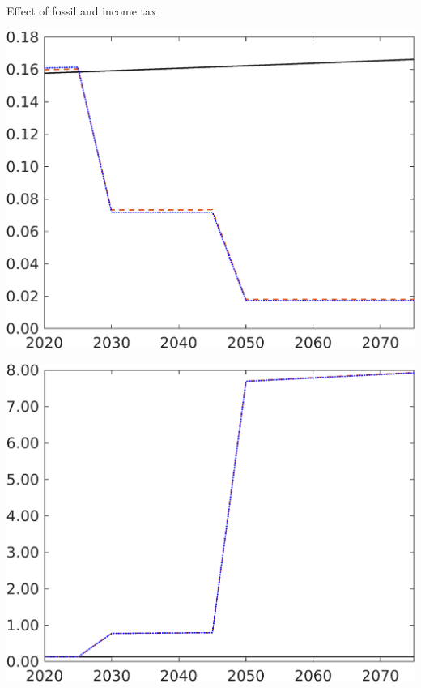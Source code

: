 \documentclass[11pt,aspectratio=169]{beamer}
\begin{document}
\begin{frame}{ Effect of fossil and income tax}
\begin{minipage}[]{0.3\textwidth}
	\end{minipage}
	\begin{minipage}[]{0.3\textwidth}
		\includegraphics[width=1\textwidth]{../codding_model/own_basedOnFried/optimalPol_elastS_DisuSci/figures/all_1705/CompCounterFac_withLF_taufopt1_taulopt0_F_spillover0_noskill0_sep1_BN0_ineq0_red0_xgrowth0_etaa0.79_lgd0.png}
	\end{minipage}
	\begin{minipage}[]{0.3\textwidth}
		\includegraphics[width=1\textwidth]{../codding_model/own_basedOnFried/optimalPol_elastS_DisuSci/figures/all_1705/CompCounterFac_withLF_taufopt1_taulopt0_GFF_spillover0_noskill0_sep1_BN0_ineq0_red0_xgrowth0_etaa0.79_lgd0.png}

\end{minipage}
\end{frame}
\end{document}
